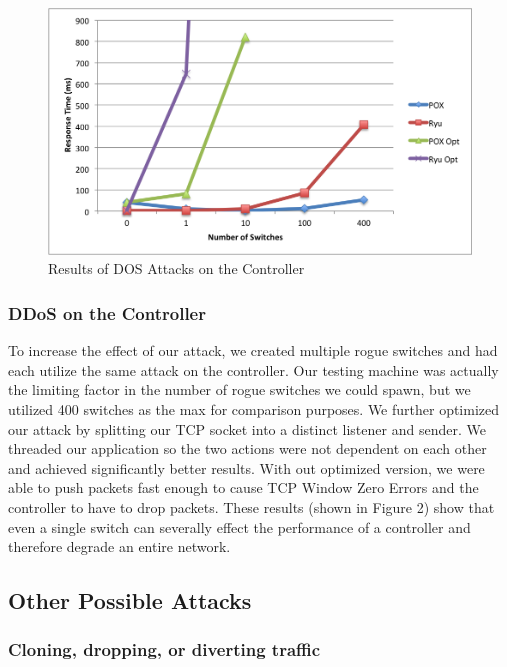 \begin{figure}
  \includegraphics[width=\linewidth]{DOSAttack.png}
  \caption{Results of DOS Attacks on the Controller \cite{protocol}}
  \label{fig:DOSattacks}
\end{figure}

\subsubsection{DDoS on the Controller}
   To increase the effect of our attack, we created multiple rogue switches and had each utilize the same attack on the controller. Our testing machine was actually the limiting factor in the number of rogue switches we could spawn, but we utilized 400 switches as the max for comparison purposes.  We further optimized our attack by splitting our TCP socket into a distinct listener and sender. We threaded our application so the two actions were not dependent on each other and achieved significantly better results. With out optimized version, we were able to push packets fast enough to cause TCP Window Zero Errors and the controller to have to drop packets.  These results (shown in Figure 2) show that even a single switch can severally effect the performance of a controller and therefore degrade an entire network. 

\subsection{Other Possible Attacks}

\subsubsection{Cloning, dropping, or diverting traffic}

